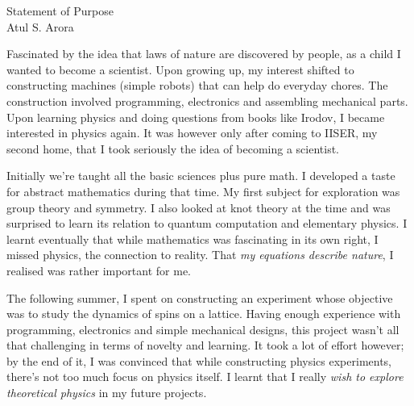 \setlength{\oddsidemargin}{-0.2in}
\setlength{\evensidemargin}{0in}
\setlength{\textwidth}{6.7in}
\setlength{\topmargin}{-1.1in}
\setlength{\textheight}{11in}
\pagestyle{empty}



\begin{center}
{\Large Statement of Purpose} \\[.1in]
{\large Atul S. Arora}
\end{center}

\vspace*{.1in}
Fascinated by the idea that laws of nature are discovered by people, as a child I wanted to become a scientist. Upon growing up, my interest shifted to constructing machines (simple robots) that can help do everyday chores. The construction involved programming, electronics and assembling mechanical parts. Upon learning physics and doing questions from books like Irodov, I became interested in physics again. It was however only after coming to IISER, my second home, that I took seriously the idea of becoming a scientist. 


Initially we're taught all the basic sciences plus pure math. I developed a taste for abstract mathematics during that time. My first subject for exploration was group theory and symmetry. I also looked at knot theory at the time and was surprised to learn its relation to quantum computation and elementary physics. I learnt eventually that while mathematics was fascinating in its own right, I missed physics, the connection to reality. That \emph{my equations describe nature}, I realised was rather important for me.


The following summer, I spent on constructing an experiment whose objective was to study the dynamics of spins on a lattice. Having enough experience with programming, electronics and simple mechanical designs, this project wasn't all that challenging in terms of novelty and learning. It took a lot of effort however; by the end of it, I was convinced that while constructing physics experiments, there's not too much focus on physics itself. I learnt that I really \emph{wish to explore theoretical physics} in my future projects.


